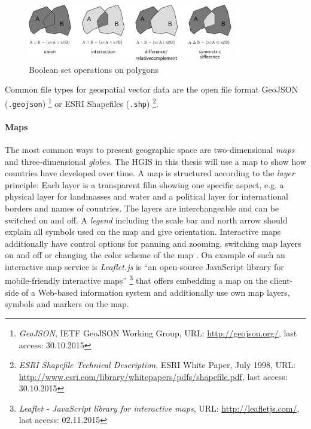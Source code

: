 \begin{figure}[ht]
  \centering
  \includegraphics[width=0.8\textwidth]{graphics/basics/hgis/polygon_operations}
  \caption{Boolean set operations on polygons}
  \label{fig:polygon_operations}
\end{figure}

Common file types for geospatial vector data are the open file format GeoJSON (\texttt{.geojson})
\footnote{
  \emph{GeoJSON},
  IETF GeoJSON Working Group,
  URL: \url{http://geojson.org/},
  last access: 30.10.2015
}
or ESRI Shapefiles (\texttt{.shp})
\footnote{
  \emph{ESRI Shapefile Technical Description},
  ESRI White Paper, July 1998,
  URL: \url{http://www.esri.com/library/whitepapers/pdfs/shapefile.pdf},
  last access: 30.10.2015
}.


\paragraph{Maps} %
\label{par:maps}

The most common ways to present geographic space are two-dimensional \emph{maps} and three-dimensional \emph{globes}. The HGIS in this thesis will use a map to show how countries have developed over time. A map is structured according to the \emph{layer} principle: Each layer is a transparent film showing one specific aspect, e.g. a physical layer for landmasses and water and a political layer for international borders and names of countries. The layers are interchangeable and can be switched on and off. A \emph{legend} including the scale bar and north arrow should explain all symbols used on the map and give orientation. Interactive maps additionally have control options for panning and zooming, switching map layers on and off or changing the color scheme of the map
\cite[pp. 159-166]{bolstad2008gis}.
On example of such an interactive map service is \emph{Leaflet.js} is ``an open-source JavaScript library for mobile-friendly interactive maps''
\footnote{
  \textit{Leaflet - JavaScript library for interactive maps},
  URL: \url{http://leafletjs.com/},
  last access: 02.11.2015
}
that offers embedding a map on the client-side of a Web-based information system and additionally use own map layers, symbols and markers on the map.

